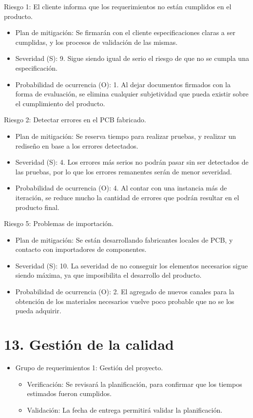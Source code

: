 \documentclass[11pt]{charter}
\begin{document}
Riesgo 1: El cliente informa que los requerimientos no están cumplidos en el producto.
\begin{itemize}
\item Plan de mitigación: Se firmarán con el cliente especificaciones claras a ser cumplidas, y los procesos de validación de las mismas.
\item Severidad (S): 9. Sigue siendo igual de serio el riesgo de que no se cumpla una especificación.
\item Probabilidad de ocurrencia (O): 1. Al dejar documentos firmados con la forma de evaluación, se elimina cualquier subjetividad que pueda existir sobre el cumplimiento del producto.
\end{itemize}
 
Riesgo 2: Detectar errores en el PCB fabricado.
\begin{itemize}
\item Plan de mitigación: Se reserva tiempo para realizar pruebas, y realizar un rediseño en base a los errores detectados.
\item Severidad (S): 4. Los errores más serios no podrán pasar sin ser detectados de las pruebas, por lo que los errores remanentes serán de menor severidad.
\item Probabilidad de ocurrencia (O): 4. Al contar con una instancia más de iteración, se reduce mucho la cantidad de errores que podrán resultar en el producto final.
\end{itemize}
 
Riesgo 5: Problemas de importación.
\begin{itemize}
\item Plan de mitigación: Se están desarrollando fabricantes locales de PCB, y contacto con importadores de componentes.
\item Severidad (S): 10. La severidad de no conseguir los elementos necesarios sigue siendo máxima, ya que imposibilita el desarrollo del producto.
\item Probabilidad de ocurrencia (O): 2. El agregado de nuevos canales para la obtención de los materiales necesarios vuelve poco probable que no se los pueda adquirir.
\end{itemize}

\section{13. Gestión de la calidad}
\label{sec:calidad}

\begin{itemize}
\item Grupo de requerimientos 1: Gestión del proyecto.
\begin{itemize}
\item Verificación: Se revisará la planificación, para confirmar que los tiempos estimados fueron cumplidos.
\item Validación: La fecha de entrega permitirá validar la planificación.
\end{itemize}
\end{itemize}
\end{document}
